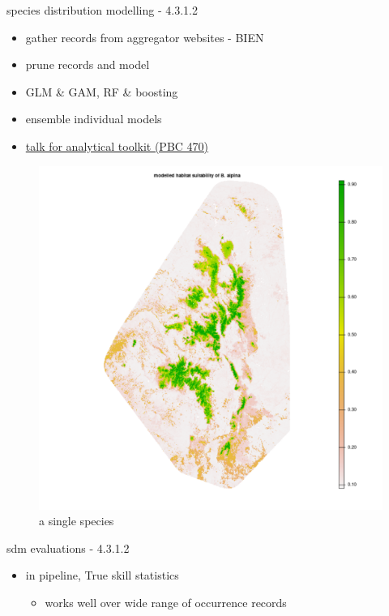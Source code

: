 \documentclass[
  ignorenonframetext,
]{beamer}
\providecommand{\tightlist}{%
  \setlength{\itemsep}{0pt}\setlength{\parskip}{0pt}}
\begin{document}
\begin{frame}{species distribution modelling - 4.3.1.2}
\protect\hypertarget{species-distribution-modelling---4.3.1.2}{}
\begin{itemize}
\tightlist
\item
  gather records from aggregator websites - BIEN
\item
  prune records and model
\item
  GLM \& GAM, RF \& boosting
\item
  ensemble individual models
\item
  \href{https://github.com/sagesteppe/Analytical_Toolkit_SDM}{talk for
  analytical toolkit (PBC 470)}
\end{itemize}

\begin{figure}
\centering
\includegraphics{../graphics/plots/besseya_predicted.resized.png}
\caption{a single species}
\end{figure}
\end{frame}

\begin{frame}{sdm evaluations - 4.3.1.2}
\protect\hypertarget{sdm-evaluations---4.3.1.2}{}
\begin{itemize}
\tightlist
\item
  in pipeline, True skill statistics

  \begin{itemize}
  \tightlist
  \item
    works well over wide range of occurrence records
  \end{itemize}
\end{itemize}
\end{frame}
\end{document}
